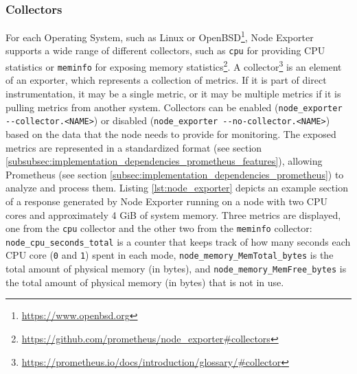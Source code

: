 \subsubsection{Collectors}
\label{subsubsec:implementation_dependencies_node_exporter-collectors}

For each Operating System, such as Linux or OpenBSD\footnote{\url{https://www.openbsd.org}},
Node Exporter supports a wide range of different collectors, such as \texttt{cpu}
for providing CPU statistics or \texttt{meminfo} for exposing memory statistics\footnote{\url{https://github.com/prometheus/node_exporter\#collectors}}.
A collector\footnote{\url{https://prometheus.io/docs/introduction/glossary/\#collector}}
is an element of an exporter, which represents a collection of metrics. If it is
part of direct instrumentation, it may be a single metric, or it may be multiple
metrics if it is pulling metrics from another system. Collectors can be enabled
(\lstinline[language=shell, basicstyle=\ttfamily, alsoletter={_, -, ., <, >},
morekeywords={[2]{node_exporter}}, morekeywords={[3]{--collector.<NAME>}}]{node_exporter --collector.<NAME>})
or disabled (\lstinline[language=shell, basicstyle=\ttfamily, alsoletter={_, -, ., <, >},
morekeywords={[2]{node_exporter}}, morekeywords={[3]{--no-collector.<NAME>}}]{node_exporter --no-collector.<NAME>})
based on the data that the node needs to provide for monitoring. The exposed metrics
are represented in a standardized format (see section
\ref{subsubsec:implementation_dependencies_prometheus_features}), allowing
Prometheus (see section \ref{subsec:implementation_dependencies_prometheus}) to
analyze and process them. Listing \ref{lst:node_exporter} depicts an example section
of a response generated by Node Exporter running on a node with two CPU cores and
approximately 4 GiB of system memory. Three metrics are displayed, one from the \texttt{cpu}
collector and the other two from the \texttt{meminfo} collector: \texttt{node\_cpu\_seconds\_total}
is a counter that keeps track of how many seconds each CPU core (\texttt{0} and \texttt{1})
spent in each mode, \texttt{node\_memory\_MemTotal\_bytes} is the total amount of
physical memory (in bytes), and \texttt{node\_memory\_MemFree\_bytes} is the total
amount of physical memory (in bytes) that is not in use.

